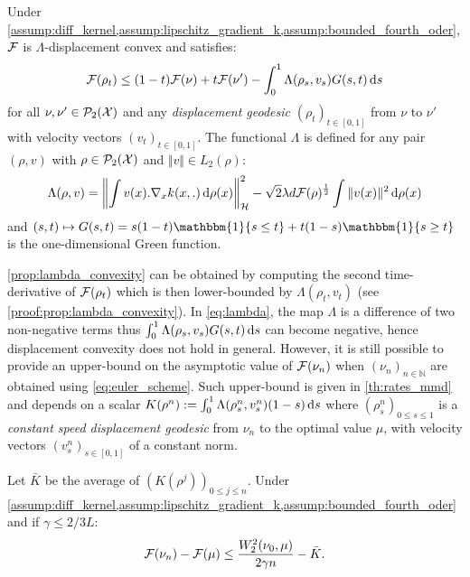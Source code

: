 \begin{proposition}
	\label{prop:lambda_convexity} Under \cref{assump:diff_kernel,assump:lipschitz_gradient_k,assump:bounded_fourth_oder}, ${{\mathcal F}}$ is $\Lambda$-displacement convex and satisfies:
		\begin{equation}
	{{\mathcal F}}(\rho_{t})\leq(1-t){{\mathcal F}}(\nu)+t{{\mathcal F}}(\nu')-\int_0^1 \Lambda(\rho_s, v_s ) G(s,t)\mathop{}\!\mathrm{d} s
	\end{equation}
for all $\nu, \nu'\in \mathcal{P}_2({{\mathcal X}})$ and any \textit{displacement geodesic} $(\rho_t)_{t\in[0,1]}$ from $\nu$ to $\nu'$ with velocity vectors $(v_t)_{t \in[0,1]}$. The functional $\Lambda$ is defined for any pair $(\rho,v)$ with $\rho\in \mathcal{P}_2({{\mathcal X}})$ and $\Vert v\Vert \in L_2(\rho)$:   
	\begin{align}\label{eq:lambda}
		\Lambda(\rho,v) = \left\Vert \int v(x).\nabla_x k(x,.) \mathop{}\!\mathrm{d} \rho(x) \right\Vert^2_{\mathcal{H}} - \sqrt{2}\lambda d {{\mathcal F}}(\rho)^{\frac{1}{2}}  \int \Vert  v(x) \Vert^2 \mathop{}\!\mathrm{d} \rho(x) 
	\end{align}
and $(s,t)\mapsto G(s,t)=  s(1-t) \mathbbm{1}\{s\leq t\}+ t(1-s) \mathbbm{1}\{s\geq t\}$	is the one-dimensional Green function.
	\end{proposition}
\cref{prop:lambda_convexity} can be obtained by computing the second time-derivative of ${{\mathcal F}}(\rho_t)$ which is then lower-bounded by $\Lambda(\rho_t,v_t)$ (see \cref{proof:prop:lambda_convexity}).
In \cref{eq:lambda}, the map $\Lambda$ is a difference of two non-negative terms thus $\int_0^1 \Lambda(\rho_s, v_s ) G(s,t)\mathop{}\!\mathrm{d} s$ can become negative, hence displacement convexity does not hold in general. However, it is still possible to provide an upper-bound on the asymptotic value of ${{\mathcal F}}(\nu_n)$ when $(\nu_n)_{n \in \mathbb{N}}$ are obtained using \cref{eq:euler_scheme}. Such upper-bound is given in \cref{th:rates_mmd} and depends on a scalar $ K(\rho^n) :=  \int_0^1\Lambda(\rho_s^n,v_s^n)(1-s)\mathop{}\!\mathrm{d} s$ where $(\rho_s^n)_{0\leq s\leq 1}$ is a \textit{constant speed displacement geodesic} from $\nu_n$ to the optimal value $\mu$, with velocity vectors $(v_s^n)_{s \in [0,1]}$ of a constant norm.  
\begin{theorem}\label{th:rates_mmd}
	Let $\bar{K}$ be the average of $(K(\rho^j))_{0\leq j \leq n}$. %
	 Under \cref{assump:diff_kernel,assump:lipschitz_gradient_k,assump:bounded_fourth_oder} and if $\gamma \leq 2/3L$:%
\begin{align}
{{\mathcal F}}(\nu_n) - {{\mathcal F}}(\mu)\leq  \frac{W_2^2(\nu_0,\mu)}{2 \gamma n} -\bar{K}.
\end{align}
\end{theorem}
